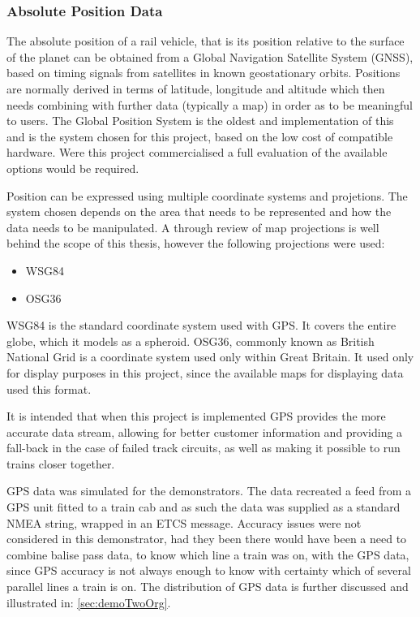 \subsubsection{Absolute Position Data}
The absolute position of a rail vehicle, that is its position relative to the surface of the planet can be obtained from a Global Navigation Satellite System (GNSS), based on timing signals from satellites in known geostationary orbits. Positions are normally derived in terms of latitude, longitude and altitude which then needs combining with further data (typically a map) in order as to be meaningful to users. The Global Position System is the oldest and implementation of this and is the system chosen for this project, based on the low cost of compatible hardware. Were this project commercialised a full evaluation of the available options would be required.

Position can be expressed using multiple coordinate systems and projetions. The system chosen depends on the area that needs to be represented and how the data needs to be manipulated. A through review of map projections is well behind the scope of this thesis, however the following projections were used:
\begin{itemize}
    \item WSG84
    \item OSG36
\end{itemize}
WSG84 is the standard coordinate system used with GPS. It covers the entire globe, which it models as a spheroid. OSG36, commonly known as British National Grid is a coordinate system used only within Great Britain. It used only for display purposes in this project, since the available maps for displaying data used this format. 

It is intended that when this project is implemented GPS provides the more accurate data stream, allowing for better customer information and providing a fall-back in the case of failed track circuits, as well as making it possible to run trains closer together.

GPS data was simulated for the demonstrators. The data recreated a feed from a GPS unit fitted to a train cab and as such the data was supplied as a standard NMEA string, wrapped in an ETCS message. Accuracy issues were not considered in this demonstrator, had they been there would have been a need to combine balise pass data, to know which line a train was on, with the GPS data, since GPS accuracy is not always enough to know with certainty which of several parallel lines a train is on. The distribution of GPS data is further discussed and illustrated in: \autoref{sec:demoTwoOrg}.

